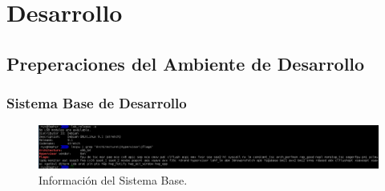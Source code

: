 
\chapter{Desarrollo}
\label{capitulo4}

\section{Preperaciones del Ambiente de Desarrollo}

\subsection{Sistema Base de Desarrollo}

\begin{figure}
	\begin{center}
    	\includegraphics[width=1.0\textwidth]{Figures/sistema-base.png}
    \end{center}
  	\caption{Información del Sistema Base.}
    \label{sistema-base}
\end{figure}

